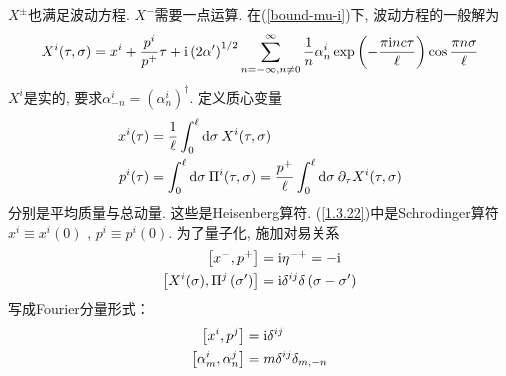 $X^\pm$也满足波动方程. $X^-$需要一点运算. 在(\ref{bound-mu-i})下, 波动方程的一般解为
\begin{equation}
X^{i}(\tau, \sigma)=x^{i}+\frac{p^{i}}{p^{+}} \tau+\mathrm{i}\left(2 \alpha^{\prime}\right)^{1 / 2} \sum_{n=-\infty , n \neq 0}^{\infty} \frac{1}{n} \alpha_{n}^{i} \exp \left(-\frac{\pi \mathrm{i} n c \tau}{\ell}\right) \cos \frac{\pi n \sigma}{\ell} \label{1.3.22}
\end{equation}
$X^i$是实的, 要求$\alpha_{-n}^{i}=\left(\alpha_{n}^{i}\right)^{\dagger}$. 定义质心变量
\begin{subequations}
\begin{align}
x^{i}(\tau)&=\frac{1}{\ell} \int_{0}^{\ell} \mathrm{d} \sigma\: X^{i}(\tau, \sigma) \\
p^{i}(\tau)&=\int_{0}^{\ell} \mathrm{d} \sigma\: \Pi^{i}(\tau, \sigma)=\frac{p^{+}}{\ell} \int_{0}^{\ell} \mathrm{d} \sigma \:\partial_{\tau} X^{i}(\tau, \sigma)
\end{align}
\end{subequations}
分别是平均质量与总动量. 
这些是Heisenberg算符. (\ref{1.3.22})中是Schrodinger算符$x^{i} \equiv x^{i}(0)$ ,  $p^{i} \equiv p^{i}(0)$.
为了量子化, 施加对易关系
\begin{subequations}
\begin{align}
\left[x^{-}, p^{+}\right]&=\mathrm{i} \eta^{-+}=-\mathrm{i}  \label{1.3.24a}\\
\left[X^{i}(\sigma), \Pi^{j}\left(\sigma^{\prime}\right)\right]&=\mathrm{i} \delta^{i j} \delta\left(\sigma-\sigma^{\prime}\right)
\label{1.3.24b}
\end{align}
\end{subequations}
写成Fourier分量形式：
\begin{subequations}
\begin{align}
\left[x^{i}, p^{j}\right]&=\mathrm{i} \delta^{i j}   \label{1.3.25a}\\
\left[\alpha_{m}^{i}, \alpha_{n}^{j}\right]&=m \delta^{i j} \delta_{m,-n}   \label{1.3.25b}
\end{align} \label{transverse-commutator}
\end{subequations}
